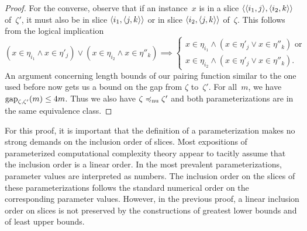 \begin{proof}
  For the converse, observe that if an instance~$x$ is in a slice ${\langle {\langle i_1, j\rangle}, {\langle i_2, k\rangle}\rangle}$ of~$\zeta'$, it must also be in slice ${\langle i_1, {\langle j, k\rangle}\rangle}$ or in slice ${\langle i_2, {\langle j, k\rangle}\rangle}$ of~$\zeta$.
  This follows from the logical implication
  \begin{equation*}
    (x \in \eta_{i_1} \land x \in \eta'_j) \lor (x \in \eta_{i_2} \land x \in \eta''_k) \implies \begin{cases}
      x \in \eta_{i_1} \land (x \in \eta'_j \lor x \in \eta''_k)\text{ or} \\
      x \in \eta_{i_2} \land (x \in \eta'_j \lor x \in \eta''_k).
    \end{cases}
  \end{equation*}
  An argument concerning length bounds of our pairing function similar to the one used before now gets us a bound on the gap from $\zeta$ to~$\zeta'$.
  For all~$m$, we have $\operatorname{gap}_{\zeta, \zeta'}(m) \le 4m$.
  Thus we also have $\zeta \preccurlyeq_\mathrm{nu} \zeta'$ and both parameterizations are in the same equivalence class.
\end{proof}

For this proof, it is important that the definition of a parameterization makes no strong demands on the inclusion order of slices.
Most expositions of parameterized computational complexity theory appear to tacitly assume that the inclusion order is a linear order.
In the most prevalent parameterizations, parameter values are interpreted as numbers.
The inclusion order on the slices of these parameterizations follows the standard numerical order on the corresponding parameter values.
However, in the previous proof, a linear inclusion order on slices is not preserved by the constructions of greatest lower bounds and of least upper bounds.

